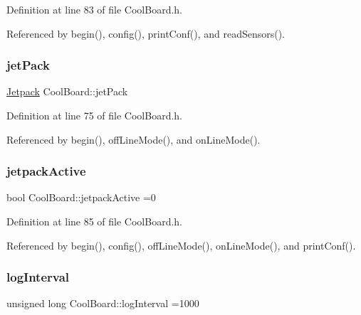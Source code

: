 Definition at line 83 of file Cool\+Board.\+h.



Referenced by begin(), config(), print\+Conf(), and read\+Sensors().

\mbox{\label{classCoolBoard_a30b1357881b01ccbec676856a91e48e9}} 
\subsubsection{\texorpdfstring{jet\+Pack}{jetPack}}
{\footnotesize\ttfamily \hyperlink{classJetpack}{Jetpack} Cool\+Board\+::jet\+Pack\hspace{0.3cm}{\ttfamily [private]}}



Definition at line 75 of file Cool\+Board.\+h.



Referenced by begin(), off\+Line\+Mode(), and on\+Line\+Mode().

\mbox{\label{classCoolBoard_a9be03a913d26e558328935ca3b59a75e}} 
\subsubsection{\texorpdfstring{jetpack\+Active}{jetpackActive}}
{\footnotesize\ttfamily bool Cool\+Board\+::jetpack\+Active =0\hspace{0.3cm}{\ttfamily [private]}}



Definition at line 85 of file Cool\+Board.\+h.



Referenced by begin(), config(), off\+Line\+Mode(), on\+Line\+Mode(), and print\+Conf().

\mbox{\label{classCoolBoard_a84bc94413b64973e4aba8c467c97006c}} 
\subsubsection{\texorpdfstring{log\+Interval}{logInterval}}
{\footnotesize\ttfamily unsigned long Cool\+Board\+::log\+Interval =1000\hspace{0.3cm}{\ttfamily [private]}}



